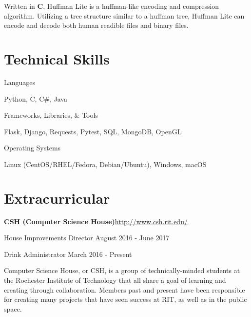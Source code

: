 \documentclass[margin,line]{resume}
\newcommand{\rurl}[1]{\hfill {\footnotesize \url{#1}}}
\begin{document}
\begin{resume}
\begin{asparablank}
		\small Written in \textbf{C}, Huffman Lite is a huffman-like encoding and compression algorithm. Utilizing a tree structure similar to a huffman tree, Huffman Lite can encode and decode both human readible files and binary files.
		\normalsize
	\end{asparablank}

\section{\mysidestyle Technical Skills}
	\begin{compactdesc}
		\item[Languages] \begin{inparaenum} { \small
			Python, C, C\#, Java
		} \end{inparaenum}
        \item[Frameworks, Libraries, \& Tools] \begin{inparaenum} { \small
        	Flask, Django, Requests, Pytest, SQL, MongoDB, OpenGL
        } \end{inparaenum}
		\item[Operating Systems] \begin{inparaenum} { \small
			Linux (CentOS/RHEL/Fedora, Debian/Ubuntu), Windows, macOS
		} \end{inparaenum}
        \normalsize
	\end{compactdesc}

\section{\mysidestyle Extracurricular}
	\begin{asparablank}
		\item {\bf CSH ({\small Computer Science House})}\rurl{http://www.csh.rit.edu/}
		\small	\item House Improvements Director \hfill August 2016 - June 2017
        \small  \item Drink Administrator \hfill March 2016 - Present
        \linebreak

        \small Computer Science House, or CSH, is a group of technically-minded students at the Rochester Institute of Technology that all share a goal of learning and creating through collaboration. Members past and present have been responsible for creating many projects that have seen success at RIT, as well as in the public space.
	\end{asparablank}


\end{resume}
\end{document}
